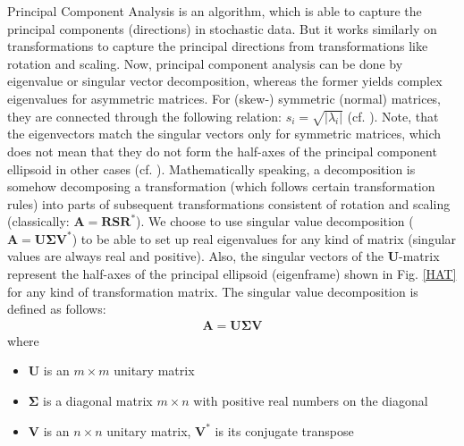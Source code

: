 \documentclass{scrartcl}
\begin{document}
Principal Component Analysis is an algorithm, which is able to capture the principal components (directions) in stochastic data. But it works similarly on transformations to capture the principal directions from transformations like rotation and scaling. Now, principal component analysis can be done by eigenvalue or singular vector decomposition, whereas the former yields complex eigenvalues for asymmetric matrices. For (skew-) symmetric (normal) matrices, they are connected through the following relation: $s_i = \sqrt{|\lambda_i|}$ (cf. \cite{kieburg}). Note, that the eigenvectors match the singular vectors only for symmetric matrices, which does not mean that they do not form the half-axes of the principal component ellipsoid in other cases (cf. \cite{moler}). Mathematically speaking, a decomposition is somehow decomposing a transformation (which follows certain transformation rules) into parts of subsequent transformations consistent of rotation and scaling (classically: $\mathbf{A} = \mathbf{R}\mathbf{S}\mathbf{R}^*$). We choose to use singular value decomposition ($\mathbf{A} = \mathbf{U} \mathbf{\Sigma} \mathbf{V}^*$) to be able to set up real eigenvalues for any kind of matrix (singular values are always real and positive). Also, the singular vectors of the $\mathbf{U}$-matrix represent the half-axes of the principal ellipsoid (eigenframe) shown in Fig. \ref{HAT} for any kind of transformation matrix. The singular value decomposition is defined as follows:
\begin{align*}
	\mathbf{A} = \mathbf{U} \boldsymbol{\Sigma} \mathbf{V}
\end{align*}
where
\begin{itemize}
	\item $\mathbf{U}$ is an $m × m$ unitary matrix
	\item $\boldsymbol{\Sigma}$ is a diagonal matrix {$m × n$} with positive real numbers on the diagonal
	\item $\mathbf{V}$ is an {$n × n$} unitary matrix, $\mathbf{V}^*$ is its conjugate transpose
\end{itemize}
 
\end{document}
